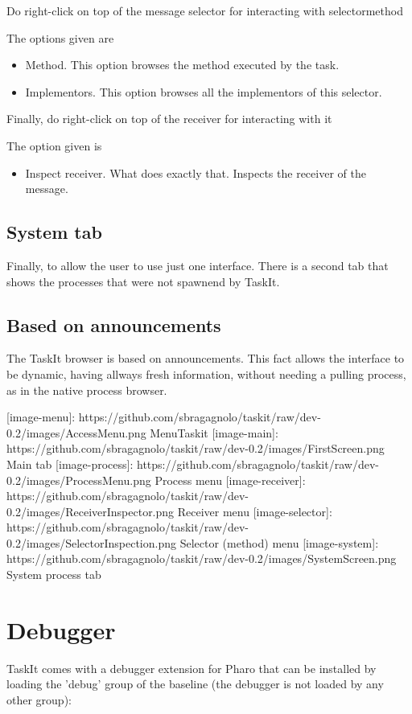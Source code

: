 \documentclass[10pt,twoside,english]{_support/latex/sbabook/sbabook}
\begin{document}
Do right-click on top of the message selector for interacting with selector\textbar{}method

The options given are

\begin{itemize}
\item Method. This option browses the method executed by the task.
\item Implementors. This option browses all the implementors of this selector. 
\end{itemize}

Finally, do right-click on top of the receiver for interacting with it

The option given is

\begin{itemize}
\item Inspect receiver. What does exactly that. Inspects the receiver of the message. 
\end{itemize}
\section{System tab}
Finally, to allow the user to use just one interface. There is a second tab that shows the processes that were not spawnend by TaskIt. 
\section{Based on announcements }
  
   The TaskIt browser is based on announcements. This fact allows the interface to be dynamic, having allways fresh information, without needing a pulling process, as in the native process browser. 
   

{[}image-menu{]}: https://github.com/sbragagnolo/taskit/raw/dev-0.2/images/AccessMenu.png MenuTaskit
{[}image-main{]}: https://github.com/sbragagnolo/taskit/raw/dev-0.2/images/FirstScreen.png Main tab
{[}image-process{]}: https://github.com/sbragagnolo/taskit/raw/dev-0.2/images/ProcessMenu.png Process menu
{[}image-receiver{]}: https://github.com/sbragagnolo/taskit/raw/dev-0.2/images/ReceiverInspector.png Receiver menu
{[}image-selector{]}: https://github.com/sbragagnolo/taskit/raw/dev-0.2/images/SelectorInspection.png Selector (method) menu
{[}image-system{]}: https://github.com/sbragagnolo/taskit/raw/dev-0.2/images/SystemScreen.png System process tab
\chapter{Debugger}
TaskIt comes with a debugger extension for Pharo that can be installed by loading the 'debug' group of the baseline (the debugger is not loaded by any other group):
\end{document}
